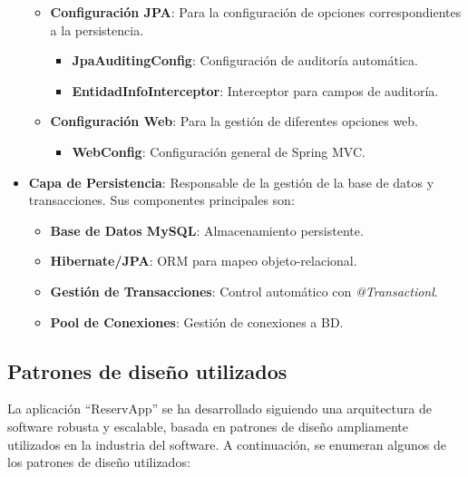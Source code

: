 \begin{itemize}
\begin{itemize}
            \item \textbf{Configuración JPA}: Para la configuración de opciones correspondientes a la persistencia.
        	\begin{itemize}
                \item \textbf{JpaAuditingConfig}: Configuración de auditoría automática.
                \item \textbf{EntidadInfoInterceptor}: Interceptor para campos de auditoría.
            \end{itemize}

            \item \textbf{Configuración Web}: Para la gestión de diferentes opciones web.
        	\begin{itemize}
                \item \textbf{WebConfig}: Configuración general de Spring MVC.
             \end{itemize}
         \end{itemize}

	\item \textbf{Capa de Persistencia}: Responsable de la gestión de la base de datos y transacciones. Sus componentes principales son:
    	\begin{itemize}
            \item \textbf{Base de Datos MySQL}: Almacenamiento persistente.
            \item \textbf{Hibernate/JPA}: ORM para mapeo objeto-relacional.
            \item \textbf{Gestión de Transacciones}: Control automático con \emph{@Transactionl}.
            \item \textbf{Pool de Conexiones}: Gestión de conexiones a BD.
         \end{itemize}
\end{itemize}

\subsection{Patrones de diseño utilizados}
La aplicación ``ReservApp'' se ha desarrollado siguiendo una arquitectura de software robusta y escalable, basada en patrones de diseño ampliamente utilizados en la industria del software. A continuación, se enumeran algunos de los patrones de diseño utilizados:

